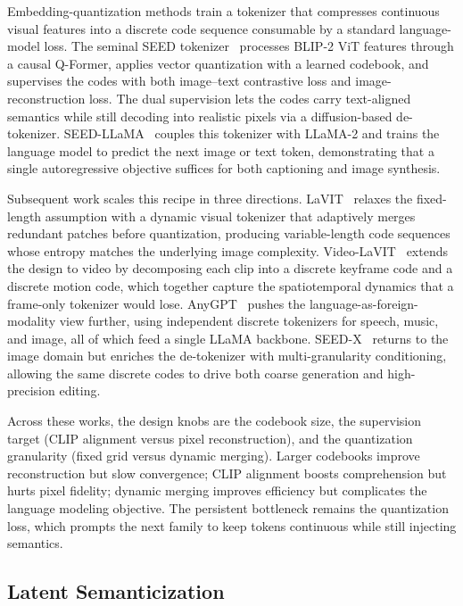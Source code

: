 Embedding-quantization methods train a tokenizer that compresses continuous visual features into a discrete code sequence consumable by a standard language-model loss. The seminal SEED tokenizer~\cite{Ge202308041} processes BLIP-2 ViT features through a causal Q-Former, applies vector quantization with a learned codebook, and supervises the codes with both image--text contrastive loss and image-reconstruction loss. The dual supervision lets the codes carry text-aligned semantics while still decoding into realistic pixels via a diffusion-based de-tokenizer. SEED-LLaMA~\cite{Ge202308041} couples this tokenizer with LLaMA-2 and trains the language model to predict the next image or text token, demonstrating that a single autoregressive objective suffices for both captioning and image synthesis.

Subsequent work scales this recipe in three directions. LaVIT~\cite{jin2024lavit} relaxes the fixed-length assumption with a dynamic visual tokenizer that adaptively merges redundant patches before quantization, producing variable-length code sequences whose entropy matches the underlying image complexity. Video-LaVIT~\cite{DBLP:conf/icml/Jin00XCJHSLZ0GM24} extends the design to video by decomposing each clip into a discrete keyframe code and a discrete motion code, which together capture the spatiotemporal dynamics that a frame-only tokenizer would lose. AnyGPT~\cite{DBLP:conf/acl/ZhanDYZZLZYZL0F24} pushes the language-as-foreign-modality view further, using independent discrete tokenizers for speech, music, and image, all of which feed a single LLaMA backbone. SEED-X~\cite{Ge202414396} returns to the image domain but enriches the de-tokenizer with multi-granularity conditioning, allowing the same discrete codes to drive both coarse generation and high-precision editing.

Across these works, the design knobs are the codebook size, the supervision target (CLIP alignment versus pixel reconstruction), and the quantization granularity (fixed grid versus dynamic merging). Larger codebooks improve reconstruction but slow convergence; CLIP alignment boosts comprehension but hurts pixel fidelity; dynamic merging improves efficiency but complicates the language modeling objective. The persistent bottleneck remains the quantization loss, which prompts the next family to keep tokens continuous while still injecting semantics.

\subsection{Latent Semanticization}
\label{subsec:latent-sem}

